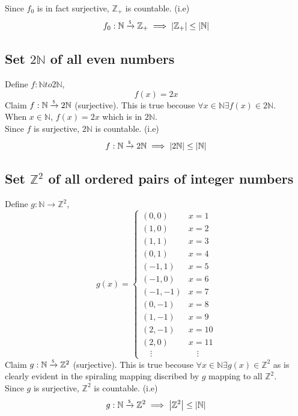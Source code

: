 \documentclass[]{article}
\newcommand{\N}{\mathbb{N}}
\newcommand{\Z}{\mathbb{Z}}
\newcommand{\toS}{\xrightarrow{\textsf{\tiny S}}}
\begin{document}
Since $f_0$ is in fact surjective, $\Z_+$ is countable. (i.e)
$$f_0 : \N \toS \Z_+ \implies \abs{\Z_+} \leq \abs{\N}$$

\subsection{Set $2\N$ of all even numbers}
Define $f : \N to 2\N$,
\begin{displaymath}
	f(x) = 2x
\end{displaymath}
Claim $f : \N \toS 2\N$ (surjective).
This is true becouse $\forall x \in \N \exists f(x) \in 2\N$.\\
When $x \in \N$, $f(x) = 2 x$ which is in $2 \N$.\\

Since $f$ is surjective, $2\N$ is countable. (i.e)
$$f : \N \toS 2\N \implies \abs{2\N} \leq \abs{\N}$$

\subsection{Set $\Z^2$ of all ordered pairs of integer numbers}
Define $g : \N \to \Z^2$,
\begin{displaymath}
	g(x) =
	\begin{cases}
		(0,0)	& x = 1\\
		(1,0)	& x = 2\\
		(1,1)	& x = 3\\
		(0,1)	& x = 4\\
		(-1,1)	& x = 5\\
		(-1,0)	& x = 6\\
		(-1,-1)	& x = 7\\
		(0,-1)	& x = 8\\
		(1,-1)	& x = 9\\
		(2,-1)	& x = 10\\
		(2,0)	& x = 11\\
		\quad \vdots & \quad \vdots
	\end{cases}
\end{displaymath}
Claim $g : \N \toS \Z^2$ (surjective).
This is true becouse $\forall x \in \N \exists g(x) \in \Z^2$ as is 
clearly evident in the spiraling mapping discribed by $g$ mapping to all $\Z^2$.\\

Since $g$ is surjective, $\Z^2$ is countable. (i.e)
$$g : \N \toS \Z^2 \implies \abs{\Z^2} \leq \abs{\N}$$

\newpage
\end{document}

